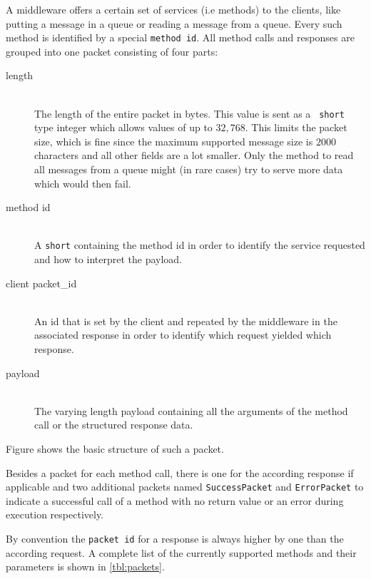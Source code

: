 \documentclass[a4paper, oneside]{csthesis}
\begin{document}
    A middleware offers a certain set of services (i.e methods) to the clients,
    like putting a message in a queue or reading a message from a queue. Every
    such method is identified by a special {\tt method id}. All method calls and
    responses are grouped into one \telesto{} packet consisting of four parts:
    \begin{description}
    \item[length] \ \\
        The length of the entire packet in bytes. This value is sent as a {\tt
        short} type integer which allows values of up to $32,768$. This limits
        the packet size, which is fine since the maximum supported message size
        is $2000$ characters and all other fields are a lot smaller. Only the
        method to read all messages from a queue might (in rare cases) try to
        serve more data which would then fail.
    \item[method id] \ \\
        A {\tt short} containing the method id in order to identify the service
        requested and how to interpret the payload.
    \item[client packet\_id] \ \\
        An id that is set by the client and repeated by the middleware in the
        associated response in order to identify which request yielded which response.
    \item[payload] \ \\
        The varying length payload containing all the arguments of the method
        call or the structured response data.
    \end{description}
    
     Figure  shows the basic structure of such a packet.
    
    Besides a packet for each method call, there is one for the according
    response if applicable and two additional packets named {\tt SuccessPacket}
    and {\tt ErrorPacket} to indicate a successful call of a method with no
    return value or an error during execution respectively.
    
    By convention the {\tt packet id} for a response is always higher by one
    than the according request. A complete list of the currently supported methods and
    their parameters is shown in \cref{tbl:packets}.
    
\end{document}

